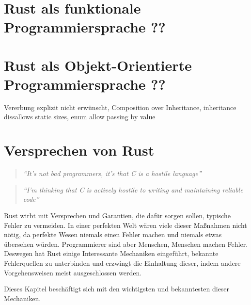 \section{Rust als funktionale Programmiersprache ??}



\section{Rust als Objekt-Orientierte Programmiersprache ??}
\label{rust:oop}

Vererbung explizit nicht erwünscht, Composition over Inheritance, inheritance dissallows static sizes, enum allow passing by value




\section{Versprechen von Rust}
\label{rust:guarantees}

\begin{quotation}
	\textit{\enquote{It’s not bad programmers, it’s that C is a hostile language}} 
	\cite[54]{rust:c_is_hostile_mena}
\end{quotation}

\begin{quotation}
	\textit{\enquote{I’m thinking that C is actively hostile to writing and maintaining reliable code}} 
	\cite[129]{rust:c_is_hostile_mena}
\end{quotation}

Rust wirbt mit Versprechen und Garantien, die dafür sorgen sollen, typische Fehler zu vermeiden.
In einer perfekten Welt wären viele dieser Maßnahmen nicht nötig, da perfekte Wesen niemals einen Fehler machen und niemals etwas übersehen würden.
Programmierer sind aber Menschen, Menschen machen Fehler.
Deswegen hat Rust einige Interessante Mechaniken eingeführt, bekannte Fehlerquellen zu unterbinden und erzwingt die Einhaltung dieser, indem andere Vorgehensweisen meist ausgeschlossen werden.

Dieses Kapitel beschäftigt sich mit den wichtigsten und bekanntesten dieser Mechaniken.


